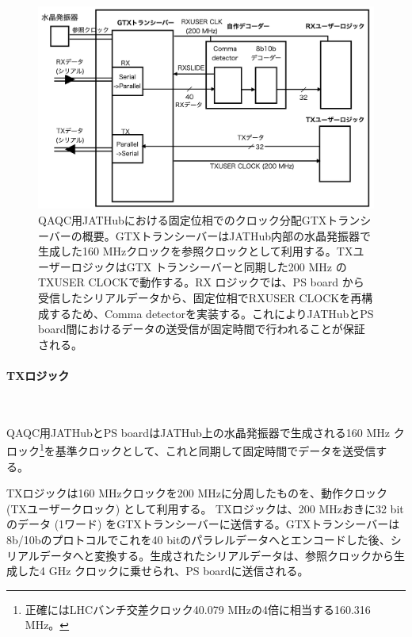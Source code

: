 \begin{figure} 
\centering
\includegraphics[width=16cm]{fig/QAQC/JATHubgtx.png}
\caption[QAQC用JATHubにおけるGTXトランシーバーの概要]{QAQC用JATHubにおける固定位相でのクロック分配GTXトランシーバーの概要。GTXトランシーバーはJATHub内部の水晶発振器で生成した160 MHzクロックを参照クロックとして利用する。TXユーザーロジックはGTX トランシーバーと同期した200 MHz のTXUSER CLOCKで動作する。RX ロジックでは、PS board から受信したシリアルデータから、固定位相でRXUSER CLOCKを再構成するため、Comma detectorを実装する。これによりJATHubとPS board間におけるデータの送受信が固定時間で行われることが保証される。}
\label{JATHubgtx}
\end{figure}


\paragraph{TXロジック}　\par
QAQC用JATHubとPS boardはJATHub上の水晶発振器で生成される160 MHz クロック\footnote{正確にはLHCバンチ交差クロック40.079 MHzの4倍に相当する160.316 MHz。}を基準クロックとして、これと同期して固定時間でデータを送受信する。

TXロジックは160 MHzクロックを200 MHzに分周したものを、動作クロック (TXユーザークロック) として利用する。
TXロジックは、200 MHzおきに32 bitのデータ (1ワード) をGTXトランシーバーに送信する。GTXトランシーバーは8b/10bのプロトコルでこれを40 bitのパラレルデータへとエンコードした後、シリアルデータへと変換する。生成されたシリアルデータは、参照クロックから生成した4 GHz クロックに乗せられ、PS boardに送信される。


